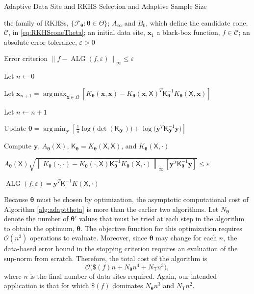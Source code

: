 \documentclass[]{mcom-l}
\theoremstyle{remark}
\DeclareMathOperator*{\argmax}{arg\,max}
\DeclareMathOperator*{\argmin}{arg\,min}
\DeclareMathOperator{\ALG}{ALG}
\newcommand{\NT}{{N_{\mT}}}
\newcommand{\Ntheta}{{N_{\btheta}}}
\newcommand{\mK}{\mathsf{K}}
\newcommand{\mT}{\mathsf{T}}
\newcommand{\mX}{\mathsf{X}}
\newcommand{\bx}{{\boldsymbol{x}}}
\newcommand{\by}{{\boldsymbol{y}}}
\newcommand{\btheta}{{\boldsymbol{\theta}}}
\newcommand{\cc}{\mathcal{C}}
\newcommand{\calf}{{\mathcal{F}}}
\newcommand{\norm}[2][{}]{\ensuremath{\left \lVert #2 \right \rVert}_{#1}}
\newcommand{\Order}{\mathcal{O}}
\begin{document}
\begin{algorithm}[H]
	\caption{Adaptive Data Site and RKHS Selection and Adaptive Sample Size \label{alg:adapttheta}}
	\begin{algorithmic}
		\PARAM the family of RKHSs, $\{\calf_{\btheta} : \btheta \in \Theta\}$; $A_\infty$ and $B_0$, which define the candidate cone, $\cc$, in \eqref{eq:RKHSconeTheta}; an initial data site, $\bx_1$
		\INPUT a black-box function, $f \in \cc$; an absolute error tolerance, $\varepsilon>0$
		
		\Ensure Error criterion $\norm[\infty]{f - \ALG(f,\varepsilon)} \le \varepsilon$
		
		\State Let $n \leftarrow 0$
		
		\Repeat
		
		
		\State Let $ \bx_{n+1} = \displaystyle \argmax_{\bx \in \Omega} [K_\btheta(\bx,\bx) - K_\btheta(\bx,\mX)^T \mK_\btheta^{-1} K_\btheta(\mX,\bx)]$
		
		\EndIf
		
		\State Let $n \leftarrow n + 1$
		
		\State Update $\displaystyle\btheta = \argmin_{\theta'}  \left[\frac 1n \log \bigl( \det(\mK_{\btheta'}) \bigr) + \log \bigl ( \by^T \mK_{\btheta'}^{-1} \by \bigr)\right]$
		
		\State Compute $\by$, $A_\btheta(\mX)$, $\mK_\btheta = K_\btheta(\mX,\mX)$, and $K_\btheta(\mX,\cdot)$
		
		\Until $A_\btheta(\mX) \sqrt{\norm[\infty]{K_\btheta(\cdot,\cdot) - K_\btheta(\cdot,\mX) \mK_\btheta^{-1} K_\btheta(\mX,\cdot)} \, [\by^T \mK_\btheta^{-1} \by] }  \le \varepsilon$
		
		\RETURN $\ALG(f,\varepsilon) = \by^T \mK^{-1} K(\mX,\cdot)$
		
	\end{algorithmic}
\end{algorithm}

Because $\btheta$ must be chosen by optimization, the asymptotic computational cost of Algorithm \ref{alg:adapttheta} is more than the earlier two algorithms.  Let $\Ntheta$ denote the number of $\btheta'$ values that must be tried at each step in the algorithm to obtain the optimum, $\btheta$.  The objective function for this optimization requires $\Order(n^3)$ operations to evaluate.  Moreover, since $\btheta$ may change for each $n$, the data-based error bound in the stopping criterion requires an evaluation of the sup-norm from scratch.  Therefore, the total cost of the algorithm is 
\begin{equation} \label{eq:compcosttheta}
\Order\bigl(\$(f)n + \Ntheta n^4 + \NT n^3 \bigr),
\end{equation}
where $n$ is the final number of data sites required.  Again, our intended application is that for which $\$(f)$ dominates $\Ntheta n^3$ and $\NT n^2$.  
\end{document}

